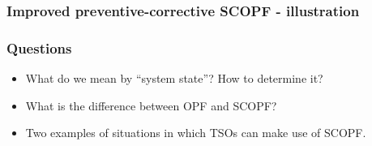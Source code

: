 \documentclass[compress]{beamer}
\begin{document}
\begin{frame}
  \frametitle{Improved preventive-corrective SCOPF - illustration}
\end{frame}

\begin{frame}
  \frametitle{Questions}
  \begin{itemize}
  \item What do we mean by ``system state''? How to determine it?
  \item What is the difference between OPF and SCOPF?
  \item Two examples of situations in which TSOs can make use of SCOPF.
  \end{itemize}
\end{frame}
\end{document}
